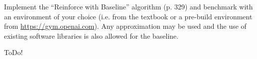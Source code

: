 
\begin{exercise}

Implement the \enquote{Reinforce with Baseline} algorithm (p. 329) and benchmark with an environment of your choice (i.e. from the textbook or a pre-build environment from \href{https://gym.openai.com}{https://gym.openai.com}).
Any approximation may be used and the use of existing software libraries is also allowed for the baseline.
\end{exercise}


\begin{solution}

ToDo!

\end{solution}

